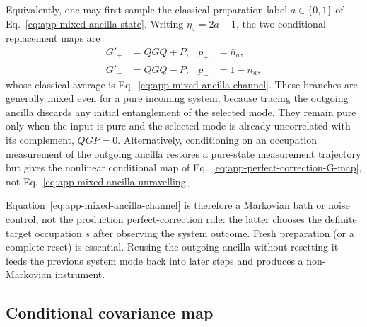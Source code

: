 Equivalently, one may first sample the classical preparation label
\(a\in\{0,1\}\) of Eq.~\eqref{eq:app-mixed-ancilla-state}.  Writing
\(\eta_a=2a-1\), the two conditional replacement maps are
\begin{align}
    G'_+&=QGQ+P,
    &p_+&=\bar n_a,\nonumber\\
    G'_-&=QGQ-P,
    &p_-&=1-\bar n_a,
    \label{eq:app-mixed-ancilla-unravelling}
\end{align}
whose classical average is Eq.~\eqref{eq:app-mixed-ancilla-channel}.  These
branches are generally mixed even for a pure incoming system, because tracing
the outgoing ancilla discards any initial entanglement of the selected mode.
They remain pure only when the input is pure and the selected mode is already
uncorrelated with its complement, \(QGP=0\).  Alternatively, conditioning on
an occupation measurement of the outgoing ancilla restores a pure-state
measurement trajectory but gives the nonlinear conditional map of
Eq.~\eqref{eq:app-perfect-correction-G-map}, not
Eq.~\eqref{eq:app-mixed-ancilla-unravelling}.

Equation~\eqref{eq:app-mixed-ancilla-channel} is therefore a Markovian bath or
noise control, not the production perfect-correction rule: the latter chooses
the definite target occupation \(s\) after observing the system outcome.
Fresh preparation (or a complete reset) is essential.  Reusing the outgoing
ancilla without resetting it feeds the previous system mode back into later
steps and produces a non-Markovian instrument.


\subsection{Conditional covariance map}

